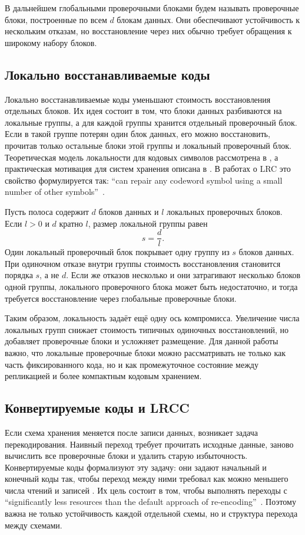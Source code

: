 В дальнейшем глобальными проверочными блоками будем называть проверочные
блоки, построенные по всем \(d\) блокам данных. Они обеспечивают
устойчивость к нескольким отказам, но восстановление через них обычно требует
обращения к широкому набору блоков.

\subsection{Локально восстанавливаемые коды}

Локально восстанавливаемые коды уменьшают стоимость восстановления отдельных
блоков. Их идея состоит в том, что блоки данных разбиваются на
локальные группы, а для каждой группы хранится отдельный проверочный блок.
Если в такой группе потерян один блок данных, его можно восстановить,
прочитав только остальные блоки этой группы и локальный проверочный
блок. Теоретическая модель локальности для кодовых символов рассмотрена в
\cite{gopalan2012lrc}, а практическая мотивация для систем хранения описана в
\cite{huang2012azure,sathiamoorthy2013xoring}. В работах о LRC это свойство
формулируется так: \enquote{can repair any codeword symbol using a
small number of other symbols}~\cite{kong2024lrcconvertible}.

Пусть полоса содержит \(d\) блоков данных и \(l\) локальных проверочных
блоков. Если \(l>0\) и \(d\) кратно \(l\), размер локальной группы равен
\[
    s = \frac{d}{l}.
\]
Один локальный проверочный блок покрывает одну группу из \(s\) блоков
данных. При одиночном отказе внутри группы стоимость восстановления становится
порядка \(s\), а не \(d\). Если же отказов несколько и они затрагивают
несколько блоков одной группы, локального проверочного блока может быть недостаточно,
и тогда требуется восстановление через глобальные проверочные блоки.

Таким образом, локальность задаёт ещё одну ось компромисса. Увеличение числа
локальных групп снижает стоимость типичных одиночных восстановлений, но
добавляет проверочные блоки и усложняет размещение. Для данной работы
важно, что локальные проверочные блоки можно рассматривать не только как
часть фиксированного кода, но и как промежуточное состояние между
репликацией и более компактным кодовым хранением.

\subsection{Конвертируемые коды и LRCC}

Если схема хранения меняется после записи данных, возникает задача
перекодирования. Наивный переход требует прочитать исходные данные, заново
вычислить все проверочные блоки и удалить старую избыточность.
Конвертируемые коды формализуют эту задачу: они задают начальный и конечный
коды так, чтобы переход между ними требовал как можно меньшего числа чтений и
записей \cite{maturana2022convertible}. Их цель состоит в том, чтобы выполнять
переходы с \enquote{significantly less resources than the default approach of
re-encoding}~\cite{maturana2022convertible}. Поэтому важна не только устойчивость
каждой отдельной схемы, но и структура перехода между схемами.

